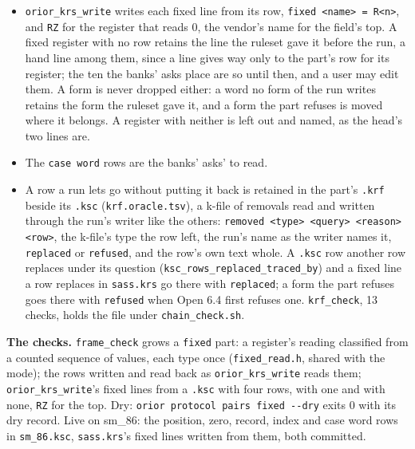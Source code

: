 \begin{itemize}
\item \texttt{orior\_\allowbreak{}krs\_\allowbreak{}write} writes each fixed line from its row, \texttt{fixed <name> = R<n>}, and \texttt{RZ} for the register that reads 0, the vendor's name for the field's top. A fixed register with no row retains the line the ruleset gave it before the run, a hand line among them, since a line gives way only to the part's row for its register; the ten the banks' asks place are so until then, and a user may edit them. A form is never dropped either: a word no form of the run writes retains the form the ruleset gave it, and a form the part refuses is moved where it belongs. A register with neither is left out and named, as the head's two lines are.
\item The \texttt{case word} rows are the banks' asks' to read.
\item A row a run lets go without putting it back is retained in the part's \texttt{.\allowbreak{}krf} beside its \texttt{.\allowbreak{}ksc} (\texttt{krf.\allowbreak{}oracle.\allowbreak{}tsv}), a k-file of removals read and written through the run's writer like the others: \texttt{removed <type> <query> <reason> <row>}, the k-file's type the row left, the run's name as the writer names it, \texttt{replaced} or \texttt{refused}, and the row's own text whole. A \texttt{.\allowbreak{}ksc} row another row replaces under its question (\texttt{ksc\_\allowbreak{}rows\_\allowbreak{}replaced\_\allowbreak{}traced\_\allowbreak{}by}) and a fixed line a row replaces in \texttt{sass.\allowbreak{}krs} go there with \texttt{replaced}; a form the part refuses goes there with \texttt{refused} when Open 6.4 first refuses one. \texttt{krf\_\allowbreak{}check}, 13 checks, holds the file under \texttt{chain\_\allowbreak{}check.\allowbreak{}sh}.
\end{itemize}

\textbf{The checks.} \texttt{frame\_\allowbreak{}check} grows a \texttt{fixed} part: a register's reading classified from a counted sequence of values, each type once (\texttt{fixed\_\allowbreak{}read.\allowbreak{}h}, shared with the mode); the rows written and read back as \texttt{orior\_\allowbreak{}krs\_\allowbreak{}write} reads them; \texttt{orior\_\allowbreak{}krs\_\allowbreak{}write}'s fixed lines from a \texttt{.\allowbreak{}ksc} with four rows, with one and with none, \texttt{RZ} for the top. Dry: \texttt{orior protocol pairs fixed -\allowbreak{}-\allowbreak{}dry} exits 0 with its dry record. Live on sm\_\allowbreak{}86: the position, zero, record, index and case word rows in \texttt{sm\_\allowbreak{}86.\allowbreak{}ksc}, \texttt{sass.\allowbreak{}krs}'s fixed lines written from them, both committed.

